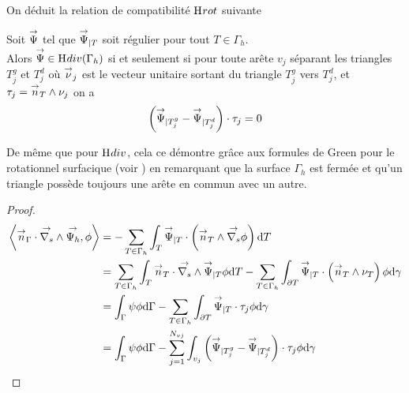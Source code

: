 On déduit la relation de compatibilité \(\mathrm{H}_\mathrm{{}}{rot}\) suivante
\begin{prop}
    \label{prop:annex:hdiv_hrot:rot}
    Soit \({\overset{\rightarrow}{\Psi}}\) tel que \({\overset{\rightarrow}{\Psi}}_{|T}\) soit régulier pour tout \(T\in\Gamma_h\).\\
    Alors \({\overset{\rightarrow}{\Psi}} \in \mathrm{H}_\mathrm{{}}{div}(\Gamma_h)\) si et seulement si pour toute arête \(v_j\) séparant les triangles \(T_j^g\) et \(T_j^d\) où \({\overset{\rightarrow}{\nu}}_j\) est le vecteur unitaire sortant du triangle \(T_j^g\) vers \(T_j^d\), et \(\tau_j = {\overset{\rightarrow}{n}}_T \wedge \nu_j\) on a
    \begin{equation}
        \left({\overset{\rightarrow}{\Psi}}_{|T_j^g} - {\overset{\rightarrow}{\Psi}}_{|T_j^d} \right) \cdot \tau_j = 0
    \end{equation}
\end{prop}

De même que pour \(\mathrm{H}_\mathrm{{}}{div}\), cela ce démontre grâce aux formules de Green pour le rotationnel surfacique (voir \cite[eq.~(A3.57)]{bladel_electromagnetic_2007}) en remarquant que la surface \(\Gamma_h\) est fermée et qu'un triangle possède toujours une arête en commun avec un autre.

\begin{proof}
    \begin{align}
    \left< {\overset{\rightarrow}{n}}_\Gamma \cdot {\overset{\rightarrow}{\nabla_s}} \wedge {\overset{\rightarrow}{\Psi_h}}, \phi \right>
    & = - \sum_{T\in\Gamma_h} \int_T {\overset{\rightarrow}{\Psi}}_{|T}  \cdot \left( {\overset{\rightarrow}{n}}_T \wedge {\overset{\rightarrow}{\nabla_s}} \phi \right) \mathrm{d}{T} \\
    & = \sum_{T\in\Gamma_h} \int_T {\overset{\rightarrow}{n}}_T \cdot {\overset{\rightarrow}{\nabla_s}} \wedge {\overset{\rightarrow}{\Psi}}_{|T} \phi \mathrm{d}{T} - \sum_{T\in\Gamma_h} \int_{\partial T}  {\overset{\rightarrow}{\Psi}}_{|T} \cdot \left({\overset{\rightarrow}{n}}_T \wedge \nu_T \right)\phi\mathrm{d}{\gamma}\\
    & = \int_\Gamma \psi \phi \mathrm{d}{\Gamma} - \sum_{T\in\Gamma_h} \int_{\partial T}  {\overset{\rightarrow}{\Psi}}_{|T} \cdot \tau_j \phi\mathrm{d}{\gamma}\\
    &= \int_\Gamma \psi \phi \mathrm{d}{\Gamma} - \sum_{j=1}^{N_{vj}} \int_{v_j}  \left({\overset{\rightarrow}{\Psi}}_{|T_j^g} - {\overset{\rightarrow}{\Psi}}_{|T_j^d} \right) \cdot \tau_j \phi\mathrm{d}{\gamma}
    \end{align}
\end{proof}